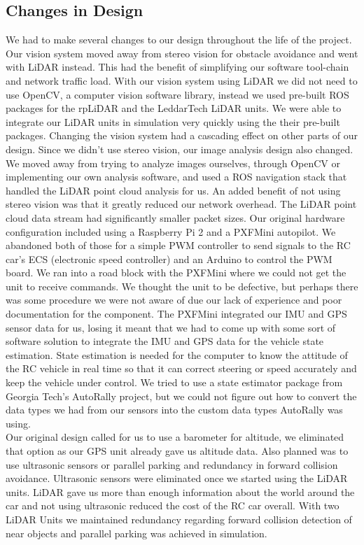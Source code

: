 \documentclass[compsoc,draftclsnofoot,onecolumn,10pt]{IEEEtran}
\begin{document}
\subsection{Changes in Design}
We had to make several changes to our design throughout the life of the project. 
Our vision system moved away from stereo vision for obstacle avoidance and went with LiDAR instead. 
This had the benefit of simplifying our software tool-chain and network traffic load. 
With our vision system using LiDAR we did not need to use OpenCV, a computer vision software library, instead we used pre-built ROS packages for the rpLiDAR and the LeddarTech LiDAR units. We were able to integrate our LiDAR units in simulation very quickly using the their pre-built packages. 
Changing the vision system had a cascading effect on other parts of our design. 
Since we didn't use stereo vision, our image analysis design also changed. \\
We moved away from trying to analyze images ourselves, through OpenCV or implementing our own analysis software, and used a ROS navigation stack that handled the LiDAR point cloud analysis for us. An added benefit of not using stereo vision was that it greatly reduced our network overhead. The LiDAR point cloud data stream had significantly smaller packet sizes.
Our original hardware configuration included using a Raspberry Pi 2 and a PXFMini autopilot. 
We abandoned both of those for a simple PWM controller to send signals to the RC car's ECS (electronic speed controller) and an Arduino to control the PWM board. 
We ran into a road block with the PXFMini where we could not get the unit to receive commands. 
We thought the unit to be defective, but perhaps there was some procedure we were not aware of due our lack of experience and poor documentation for the component. 
The PXFMini integrated our IMU and GPS sensor data for us, losing it meant that we had to come up with some sort of software solution to integrate the IMU and GPS data for the vehicle state estimation.
State estimation is needed for the computer to know the attitude of the RC vehicle in real time so that it can correct steering or speed accurately and keep the vehicle under control. 
We tried to use a state estimator package from Georgia Tech's AutoRally project, but we could not figure out how to convert the data types we had from our sensors into the custom data types AutoRally was using.\\
Our original design called for us to use a barometer for altitude, we eliminated that option as our GPS unit already gave us altitude data. Also planned was to use ultrasonic sensors or parallel parking and redundancy in forward collision avoidance. Ultrasonic sensors were eliminated once we started using the LiDAR units. LiDAR gave us more than enough information about the world around the car and not using ultrasonic reduced the cost of the RC car overall. With two LiDAR Units we maintained redundancy regarding forward collision detection of near objects and parallel parking was achieved in simulation.\\
\end{document}
